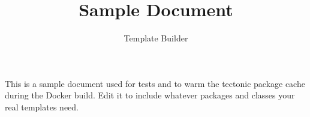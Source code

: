 \documentclass{article}
\begin{document}
\title{Sample Document}
\author{Template Builder}
\maketitle

This is a sample document used for tests and to warm the tectonic
package cache during the Docker build. Edit it to include whatever
packages and classes your real templates need.
\end{document}
